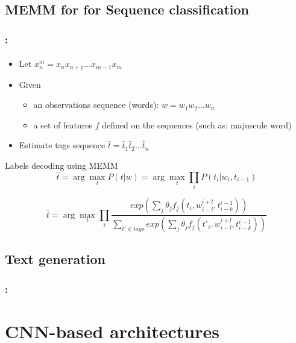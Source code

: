 \documentclass[xcolor=table]{beamer}
\begin{document}
\subsection{MEMM for for Sequence classification}

\begin{frame}
	\frametitle{\insertshortsubtitle: \insertsection}
	\framesubtitle{\insertsubsection}
	
	\begin{itemize}
			\item Let $x_{n}^{m} = x_n x_{n+1} \ldots x_{m-1} x_m$
			\item Given 
			\begin{itemize}
					\item an observations sequence (words): $w = w_1 w_2 \ldots w_n$
					\item a set of features $f$ defined on the sequences (such as: majuscule word)
				\end{itemize}
			\item Estimate tags sequence $\hat{t} = \hat{t}_1 \hat{t}_2 \ldots \hat{t}_n$
		\end{itemize}
	
	\begin{block}{Labels decoding using MEMM}
			\[
			\hat{t} = \arg\max\limits_t P(t | w) = \arg\max\limits_t \prod\limits_{i}  P(t_i | w_i, t_{i-1})
			\]
			
			\[
			\hat{t} = \arg\max\limits_t \prod\limits_{i}  
			\frac{exp\left(\sum_j \theta_j f_j(t_i, w_{i-l}^{i+l}, t_{i-k}^{i-1})\right)}%
			{\sum_{t' \in tags} exp\left(\sum_j \theta_j f_j(t'_i, w_{i-l}^{i+l}, t_{i-k}^{i-1})\right)}
			\]
		\end{block}
	
\end{frame}

\subsection{Text generation}

\begin{frame}
	\frametitle{\insertshortsubtitle: \insertsection}
	\framesubtitle{\insertsubsection}
	
\end{frame}


\section{CNN-based architectures}
\end{document}
